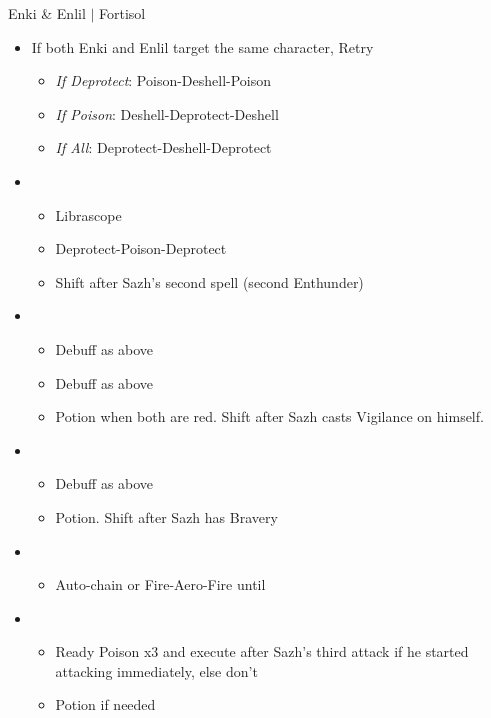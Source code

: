 \begin{battle}{Enki \& Enlil $|$ Fortisol}
\begin{multicols}{2}
\begin{itemize}
    \item If both Enki and Enlil target the same character, Retry
    
        \begin{itemize}
            \item \textit{If Deprotect}: Poison-Deshell-Poison
            \item \textit{If Poison}: Deshell-Deprotect-Deshell
            \item \textit{If All}: Deprotect-Deshell-Deprotect
        \end{itemize}
    \item \second
    \begin{itemize}
        \item Librascope
        \item Deprotect-Poison-Deprotect
        \item Shift after Sazh's second spell (second Enthunder)
    \end{itemize}
    \item \third
    \begin{itemize}
        \item Debuff as above
        \item Debuff as above
        \item Potion when both are red. Shift after Sazh casts Vigilance on himself.
    \end{itemize}
    \item \second
    \begin{itemize}
        \item Debuff as above
        \item Potion. Shift after Sazh has Bravery
    \end{itemize}
    \item \fourth
    \begin{itemize}
        \item Auto-chain or Fire-Aero-Fire until \stagger
    \end{itemize}
    \item \sixth
    \begin{itemize}
        \item Ready Poison x3 and execute after Sazh's third attack if he started attacking immediately, else don't
        \item Potion if needed

\end{itemize}
\end{itemize}
\end{multicols}
\end{battle}
